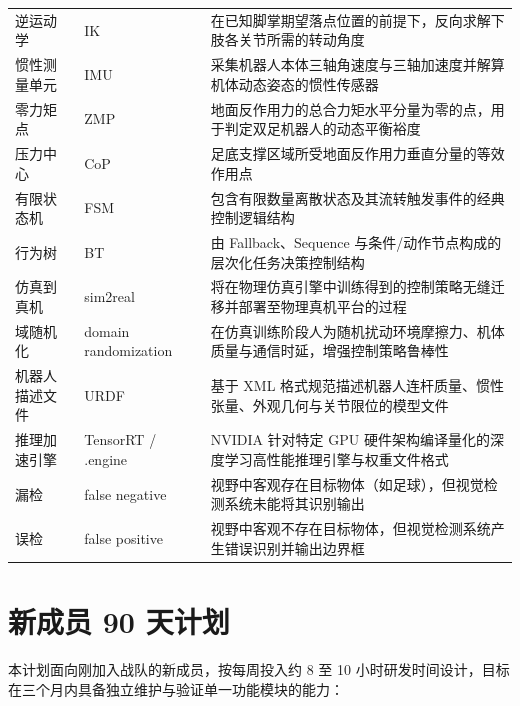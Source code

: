 \begin{longtable}{p{2.6cm} p{4.2cm} p{7.4cm}}
\addlinespace
逆运动学 & IK & 在已知脚掌期望落点位置的前提下，反向求解下肢各关节所需的转动角度 \\
\addlinespace
惯性测量单元 & IMU & 采集机器人本体三轴角速度与三轴加速度并解算机体动态姿态的惯性传感器 \\
\addlinespace
零力矩点 & ZMP & 地面反作用力的总合力矩水平分量为零的点，用于判定双足机器人的动态平衡裕度 \\
\addlinespace
压力中心 & CoP & 足底支撑区域所受地面反作用力垂直分量的等效作用点 \\
\addlinespace
有限状态机 & FSM & 包含有限数量离散状态及其流转触发事件的经典控制逻辑结构 \\
\addlinespace
行为树 & BT & 由 Fallback、Sequence 与条件/动作节点构成的层次化任务决策控制结构 \\
\addlinespace
仿真到真机 & sim2real & 将在物理仿真引擎中训练得到的控制策略无缝迁移并部署至物理真机平台的过程 \\
\addlinespace
域随机化 & domain randomization & 在仿真训练阶段人为随机扰动环境摩擦力、机体质量与通信时延，增强控制策略鲁棒性 \\
\addlinespace
机器人描述文件 & URDF & 基于 XML 格式规范描述机器人连杆质量、惯性张量、外观几何与关节限位的模型文件 \\
\addlinespace
推理加速引擎 & TensorRT / .engine & NVIDIA 针对特定 GPU 硬件架构编译量化的深度学习高性能推理引擎与权重文件格式 \\
\addlinespace
漏检 & false negative & 视野中客观存在目标物体（如足球），但视觉检测系统未能将其识别输出 \\
\addlinespace
误检 & false positive & 视野中客观不存在目标物体，但视觉检测系统产生错误识别并输出边界框 \\
\end{longtable}

\section{新成员 90 天计划}

本计划面向刚加入战队的新成员，按每周投入约 8 至 10 小时研发时间设计，目标在三个月内具备独立维护与验证单一功能模块的能力：

